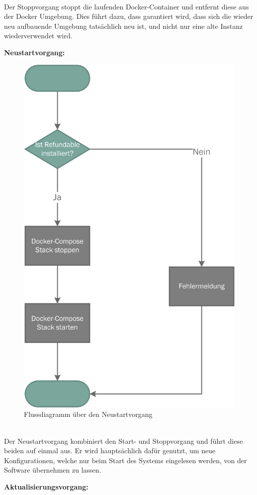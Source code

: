 ~\\
Der Stoppvorgang stoppt die laufenden Docker-Container und entfernt diese aus der Docker Umgebung. Dies führt dazu, dass garantiert wird, dass sich die wieder neu aufbauende Umgebung tatsächlich neu ist, und nicht nur eine alte Instanz wiederverwendet wird.

\newpage

\textbf{Neustartvorgang:}

\begin{figure}[H]
	\centering
	\includegraphics[width=0.5\linewidth]{images/mbeier_konzept/Restart}
	\caption[Flussdiagramm über den Neustartvorgang]{Flussdiagramm über den Neustartvorgang}
	\label{fig:restart}
\end{figure}
~\\
Der Neustartvorgang kombiniert den Start- und Stoppvorgang und führt diese beiden auf einmal aus. Er wird hauptsächlich dafür genutzt, um neue Konfigurationen, welche nur beim Start des Systems eingelesen werden, von der Software übernehmen zu lassen.

\newpage

\textbf{Aktualisierungsvorgang:}

